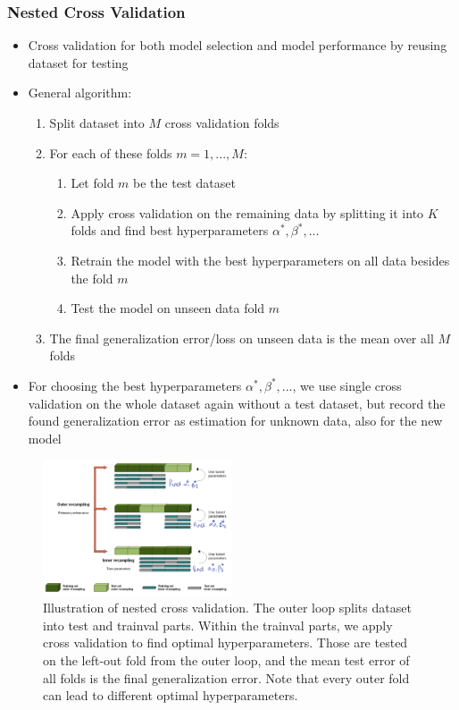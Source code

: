 \subsubsection{Nested Cross Validation}
\begin{itemize}
	\item Cross validation for both model selection and model performance by reusing dataset for testing
	\item General algorithm:
	\begin{enumerate}
		\item Split dataset into $M$ cross validation folds
		\item For each of these folds $m=1,...,M$:
		\begin{enumerate}
			\item Let fold $m$ be the test dataset
			\item Apply cross validation on the remaining data by splitting it into $K$ folds and find best hyperparameters $\alpha^*,\beta^*,...$
			\item Retrain the model with the best hyperparameters on all data besides the fold $m$
			\item Test the model on unseen data fold $m$ 
		\end{enumerate}
		\item The final generalization error/loss on unseen data is the mean over all $M$ folds
	\end{enumerate}
	\item For choosing the best hyperparameters $\alpha^*,\beta^*,...$, we use single cross validation on the whole dataset again without a test dataset, but record the found generalization error as estimation for unknown data, also for the new model
\end{itemize}
\begin{figure}[ht]
	\centering
	\includegraphics[width=0.5\textwidth]{figures/cross_validation_nested.png}
	\caption{Illustration of nested cross validation. The outer loop splits dataset into test and trainval parts. Within the trainval parts, we apply cross validation to find optimal hyperparameters. Those are tested on the left-out fold from the outer loop, and the mean test error of all folds is the final generalization error. Note that every outer fold can lead to different optimal hyperparameters.}
	\label{img:linear_regression_nested_cross_validation}
\end{figure}
